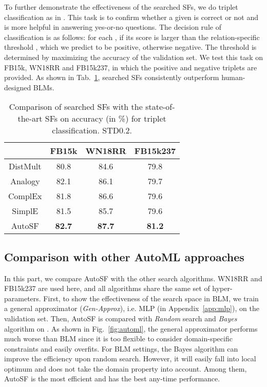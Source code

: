\documentclass[conference]{IEEEtran}
\begin{document}
To further demonstrate the effectiveness of the searched SFs,
we do triplet classification as in \cite{wang2014knowledge}.
This task is to confirm whether a given  is correct or not
and is more helpful in answering yes-or-no questions.
The decision rule of classification is as follows:
for each ,
if its score is larger than the relation-specific threshold ,
which we predict to be positive,
otherwise negative.
The threshold  is determined by maximizing the accuracy 
of the validation set.
We test this task on FB15k, WN18RR and FB15k237, in which the positive and negative triplets are provided.
As shown in 
Tab.~\ref{tab:trip:class}, searched SFs consistently outperform human-designed BLMs.


\begin{table}[H]
\centering
	\vspace{-5px}
	\caption{Comparison of searched SFs with the state-of-the-art SFs on accuracy (in \%) for triplet classification. STD0.2.}
	\label{tab:trip:class}
	\vspace{-10px}
	\begin{tabular}{c|ccc}
\hline &     FB15k     &    WN18RR     &   FB15k237    \\ \hline
		DistMult      &     80.8      &     84.6      &     79.8      \\ \hline
		Analogy       &     82.1      &     86.1      &     79.7      \\ \hline
		ComplEx       &     81.8      &     86.6      &     79.6      \\ \hline
		SimplE       &     81.5      &     85.7      &     79.6      \\ \hline
		AutoSF       & \textbf{82.7} & \textbf{87.7} & \textbf{81.2} \\ \hline
	\end{tabular}
	\vspace{-5px}
\end{table}






\subsection{Comparison with other AutoML approaches} 
\label{ssec:comprand}

In this part, we compare AutoSF with the other search algorithms.
WN18RR and FB15k237 are used here, and all algorithms share the same set of hyper-parameters.
First, to show the effectiveness of the search space in BLM, 
we train a general approximator (\textit{Gen-Approx}), i.e.  MLP (in Appendix~\ref{app:mlp}), on the validation set.
Then, AutoSF is compared with \textit{Random} search and \textit{Bayes} algorithm 
\cite{bergstra2011algorithms}
on . 
As shown in Fig.~\ref{fig:automl},
the general approximator performs much worse than BLM
since it is too flexible to consider domain-specific constraints and easily overfits.
For BLM settings, the Bayes algorithm can improve the efficiency upon random search.
However, it will easily fall into local optimum
and does not take the domain property into account.
Among them,
AutoSF is the most efficient and has the best any-time performance.
\end{document}
